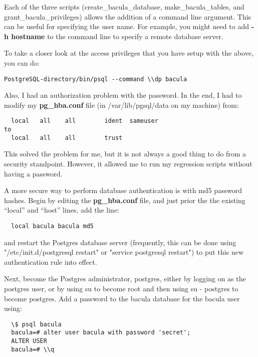 Each of the three scripts (create\_bacula\_database, make\_bacula\_tables, and
grant\_bacula\_privileges) allows the addition of a command line argument.
This can be useful for specifying the user name. For example, you might need
to add {\bf -h hostname} to the command line to specify a remote database
server. 

To take a closer look at the access privileges that you have setup with the
above, you can do: 

\footnotesize
\begin{verbatim}
PostgreSQL-directory/bin/psql --command \\dp bacula
\end{verbatim}
\normalsize

Also, I had an authorization problem with the password. In the end,
I had to modify my {\bf pg\_hba.conf} file (in /var/lib/pgsql/data on my machine)
from:

\footnotesize
\begin{verbatim}
  local   all    all        ident  sameuser
to
  local   all    all        trust
\end{verbatim}
\normalsize

This solved the problem for me, but it is not always a good thing
to do from a security standpoint.  However, it allowed me to run
my regression scripts without having a password.

A more secure way to perform database authentication is with md5
password hashes.  Begin by editing the {\bf pg\_hba.conf} file, and
just prior the the existing ``local'' and ``host'' lines, add the line:

\footnotesize
\begin{verbatim}
  local bacula bacula md5
\end{verbatim}
\normalsize

and restart the Postgres database server (frequently, this can be done
using "/etc/init.d/postgresql restart" or "service postgresql restart") to
put this new authentication rule into effect.

Next, become the Postgres administrator, postgres, either by logging
on as the postgres user, or by using su to become root and then using
su - postgres to become postgres.  Add a password to the bacula
database for the bacula user using:

\footnotesize
\begin{verbatim}
  \$ psql bacula
  bacula=# alter user bacula with password 'secret';
  ALTER USER
  bacula=# \\q
\end{verbatim}
\normalsize

